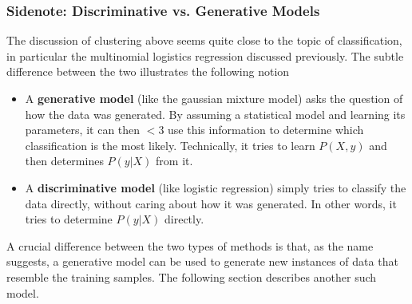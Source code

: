 \documentclass{article}
\begin{document}
\subsubsection*{Sidenote: Discriminative vs. Generative Models}
The discussion of clustering above seems quite close to the topic of classification, in particular the multinomial logistics regression discussed previously. The subtle difference between the two illustrates the following notion
\begin{itemize}
    \item A \textbf{generative model} (like the gaussian mixture model) asks the question of how the data was generated. By assuming a statistical model and learning its parameters, it can then $<3$ use this information to determine which classification is the most likely. Technically, it tries to learn $P(X,y)$ and then determines $P(y|X)$ from it.
    \item A \textbf{discriminative model} (like logistic regression) simply tries to classify the data directly, without caring about how it was generated. In other words, it tries to determine $P(y|X)$ directly.
\end{itemize}
A crucial difference between the two types of methods is that, as the name suggests, a generative model can be used to generate new instances of data that resemble the training samples. The following section describes another such model.
\end{document}
